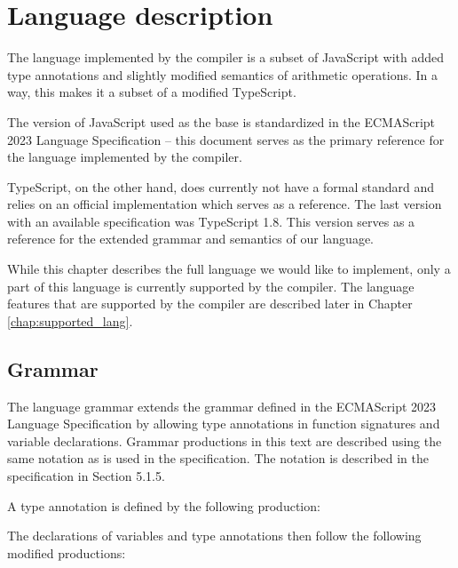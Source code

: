 \chapter{Language description}\label{language}

The language implemented by the compiler is a subset of JavaScript with added type annotations and slightly modified semantics of arithmetic operations. In a way, this makes it a subset of a modified TypeScript.

The version of JavaScript used as the base is standardized in the ECMAScript 2023 Language Specification\cite{ecma262} -- this document serves as the primary reference for the language implemented by the compiler.

TypeScript, on the other hand, does currently not have a formal standard and relies on an official implementation which serves as a reference. The last version with an available specification was TypeScript 1.8\cite{typescript18}. This version serves as a reference for the extended grammar and semantics of our language.

While this chapter describes the full language we would like to implement, only a part of this language is currently supported by the compiler. The language features that are supported by the compiler are described later in Chapter \ref{chap:supported_lang}.


\section{Grammar}\label{lang:grammar}

The language grammar extends the grammar defined in the ECMAScript 2023 Language Specification\cite{ecma262} by allowing type annotations in function signatures and variable declarations. Grammar productions in this text are described using the same notation as is used in the specification. The notation is described in the specification in Section 5.1.5.

A type annotation is defined by the following production:

\GrammarRule[TypeAnnotation]{}{
    \terminal{:} \nonterminal[Identifier]{}{}
}


The declarations of variables and type annotations then follow the following modified productions:




